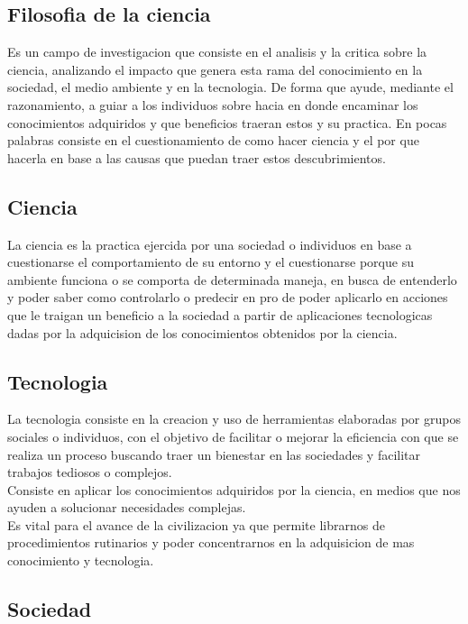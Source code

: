 \subsection{Filosofia de la ciencia}

Es un campo de investigacion que consiste en el analisis y la critica sobre la ciencia, analizando el impacto que genera esta rama del conocimiento en la sociedad, el medio ambiente y en la tecnologia. De forma que ayude, mediante el razonamiento, a guiar a los individuos sobre hacia en donde encaminar los conocimientos adquiridos y que beneficios traeran estos y su practica. En pocas palabras consiste en el cuestionamiento de como hacer ciencia y el por que hacerla en base a las causas que puedan traer estos descubrimientos.

\subsection{Ciencia}

La ciencia es la practica ejercida por una sociedad o individuos en base a cuestionarse el comportamiento de su entorno y el cuestionarse porque su ambiente funciona o se comporta de determinada maneja, en busca de entenderlo y poder saber como controlarlo o predecir en pro de poder aplicarlo en acciones que le traigan un beneficio a la sociedad a partir de aplicaciones tecnologicas dadas por la adquicision de los conocimientos obtenidos por la ciencia.

\subsection{Tecnologia}

La tecnologia consiste en la creacion y uso de herramientas elaboradas por grupos sociales o individuos, con el objetivo de facilitar o mejorar la eficiencia con que se realiza un proceso buscando traer un bienestar en las sociedades y facilitar trabajos tediosos o complejos.\\
Consiste en aplicar los conocimientos adquiridos por la ciencia, en medios que nos ayuden a solucionar necesidades complejas.\\
Es vital para el avance de la civilizacion ya que permite librarnos de procedimientos rutinarios y poder concentrarnos en la adquisicion de mas conocimiento y tecnologia.

\subsection{Sociedad}

